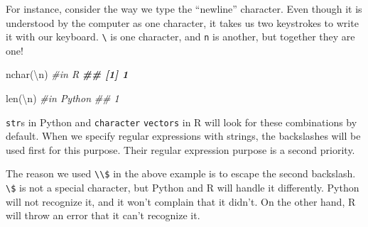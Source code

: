 \documentclass[
  12pt,
  krantz2]{krantz}
\makeatletter
\newenvironment{Shaded}{\begin{snugshade}}{\end{snugshade}}
\newcommand{\BuiltInTok}[1]{#1}
\newcommand{\CharTok}[1]{\textcolor[rgb]{0.5,0.5,0.5}{#1}}
\newcommand{\CommentTok}[1]{\textcolor[rgb]{0.37,0.37,0.37}{\textit{#1}}}
\newcommand{\DocumentationTok}[1]{\textcolor[rgb]{0.37,0.37,0.37}{\textbf{\textit{#1}}}}
\newcommand{\FunctionTok}[1]{\textcolor[rgb]{0,0,0}{#1}}
\newcommand{\NormalTok}[1]{#1}
\newcommand{\SpecialCharTok}[1]{\textcolor[rgb]{0,0,0}{#1}}
\newcommand{\StringTok}[1]{\textcolor[rgb]{0.5,0.5,0.5}{#1}}
\newenvironment{kframe}{%
\medskip{}
\setlength{\fboxsep}{.8em}
 \def\at@end@of@kframe{}%
 \ifinner\ifhmode%
  \def\at@end@of@kframe{\end{minipage}}%
  \begin{minipage}{\columnwidth}%
 \fi\fi%
 \def\FrameCommand##1{\hskip\@totalleftmargin \hskip-\fboxsep
 \colorbox{shadecolor}{##1}\hskip-\fboxsep
     \hskip-\linewidth \hskip-\@totalleftmargin \hskip\columnwidth}%
 \MakeFramed {\advance\hsize-\width
   \@totalleftmargin\z@ \linewidth\hsize
   \@setminipage}}%
 {\par\unskip\endMakeFramed%
 \at@end@of@kframe}
\renewenvironment{Shaded}{\begin{kframe}}{\end{kframe}}
\makeatother
\begin{document}
For instance, consider the way we type the ``newline'' character. Even though it is understood by the computer as one character, it takes us two keystrokes to write it with our keyboard. \texttt{\textbackslash{}} is one character, and \texttt{n} is another, but together they are one!

\begin{Shaded}
\begin{Highlighting}[]
\FunctionTok{nchar}\NormalTok{(}\StringTok{\textquotesingle{}}\SpecialCharTok{\textbackslash{}n}\StringTok{\textquotesingle{}}\NormalTok{) }\CommentTok{\#in R}
\DocumentationTok{\#\# [1] 1}
\end{Highlighting}
\end{Shaded}

\begin{Shaded}
\begin{Highlighting}[]
\BuiltInTok{len}\NormalTok{(}\StringTok{\textquotesingle{}}\CharTok{\textbackslash{}n}\StringTok{\textquotesingle{}}\NormalTok{) }\CommentTok{\#in Python}
\CommentTok{\#\# 1}
\end{Highlighting}
\end{Shaded}

\texttt{str}s in Python and \texttt{character} \texttt{vectors} in R will look for these combinations by default. When we specify regular expressions with strings, the backslashes will be used first for this purpose. Their regular expression purpose is a second priority.

The reason we used \texttt{\textbackslash{}\textbackslash{}\$} in the above example is to escape the second backslash. \texttt{\textbackslash{}\$} is not a special character, but Python and R will handle it differently. Python will not recognize it, and it won't complain that it didn't. On the other hand, R will throw an error that it can't recognize it.

\begin{Shaded}
\end{Shaded}

\begin{Shaded}
\end{Shaded}
\end{document}
